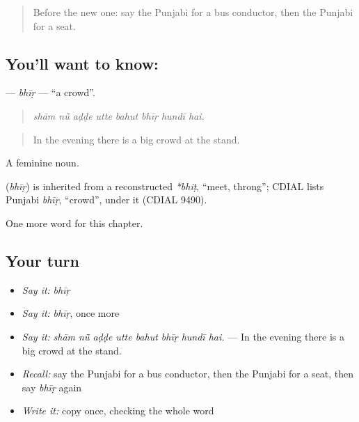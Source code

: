 \begin{quote}
Before the new one: say the Punjabi for a bus conductor, then the Punjabi for a seat.
\end{quote}

\subsection*{You'll want to know: }
\textbf{} — \emph{bhīṛ} — \textquotedblleft{}a crowd\textquotedblright{}.

\begin{quote}
       
\end{quote}

\begin{quote}
\emph{shām nū̃ aḍḍe utte bahut bhīṛ hundī hai.}
\end{quote}

\begin{quote}
In the evening there is a big crowd at the stand.
\end{quote}

A feminine noun.

\begin{cousinweb}
\textbf{} (\emph{bhīṛ}) is inherited from a reconstructed \emph{*bhiṭ}, \textquotedblleft{}meet, throng\textquotedblright{}; CDIAL lists Punjabi \emph{bhīṛ}, \textquotedblleft{}crowd\textquotedblright{}, under it (CDIAL 9490).
\end{cousinweb}

\begin{grammarlens}[title={What you've built}]
One more word for this chapter.
\end{grammarlens}

\subsection*{Your turn}
\begin{itemize}
\raggedright
  \item \emph{Say it:} \emph{bhīṛ}
  \item \emph{Say it:} \emph{bhīṛ}, once more
  \item \emph{Say it:} \emph{shām nū̃ aḍḍe utte bahut bhīṛ hundī hai.} — In the evening there is a big crowd at the stand.
  \item \emph{Recall:} say the Punjabi for a bus conductor, then the Punjabi for a seat, then say \emph{bhīṛ} again
  \item \emph{Write it:} copy \textbf{} once, checking the whole word
\end{itemize}

